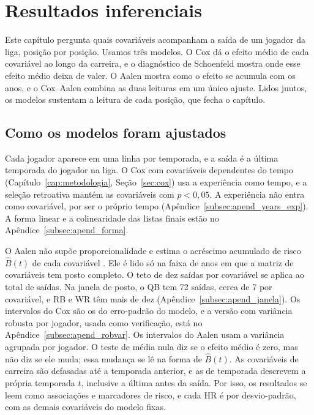 
\chapter{Resultados inferenciais}
\label{cap:resultados}

Este capítulo pergunta quais covariáveis acompanham a saída de um jogador da liga, posição por posição. Usamos três modelos. O Cox dá o efeito médio de cada covariável ao longo da carreira, e o diagnóstico de Schoenfeld mostra onde esse efeito médio deixa de valer. O Aalen mostra como o efeito se acumula com os anos, e o Cox--Aalen combina as duas leituras em um único ajuste. Lidos juntos, os modelos sustentam a leitura de cada posição, que fecha o capítulo.

\section{Como os modelos foram ajustados}
\label{sec:res_procedimentos}

Cada jogador aparece em uma linha por temporada, e a saída é a última temporada do jogador na liga. O Cox com covariáveis dependentes do tempo (Capítulo~\ref{cap:metodologia}, Seção~\ref{sec:cox}) usa a experiência como tempo, e a seleção retroativa mantém as covariáveis com $p<0{,}05$. A experiência não entra como covariável, por ser o próprio tempo (Apêndice~\ref{subsec:apend_years_exp}). A forma linear e a colinearidade das listas finais estão no Apêndice~\ref{subsec:apend_forma}.

O Aalen não supõe proporcionalidade e estima o acréscimo acumulado de risco $\hat B(t)$ de cada covariável \citep{aalen1980}. Ele é lido só na faixa de anos em que a matriz de covariáveis tem posto completo. O teto de dez saídas por covariável \citep{harrell2001} se aplica ao total de saídas. Na janela de posto, o QB tem 72 saídas, cerca de 7 por covariável, e RB e WR têm mais de dez (Apêndice~\ref{subsec:apend_janela}). Os intervalos do Cox são os do erro-padrão do modelo, e a versão com variância robusta por jogador, usada como verificação, está no Apêndice~\ref{subsec:apend_robvar}. Os intervalos do Aalen usam a variância agrupada por jogador. O teste de média nula diz se o efeito médio é zero, mas não diz se ele muda; essa mudança se lê na forma de $\hat B(t)$. As covariáveis de carreira são defasadas até a temporada anterior, e as de temporada descrevem a própria temporada $t$, inclusive a última antes da saída. Por isso, os resultados se leem como associações e marcadores de risco, e cada HR é por desvio-padrão, com as demais covariáveis do modelo fixas.

